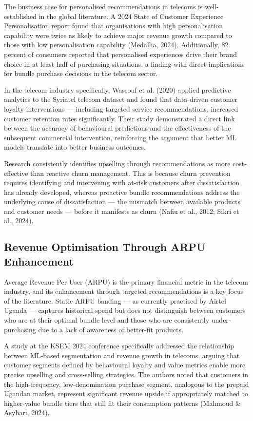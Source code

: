 The business case for personalised recommendations in telecoms is well-established in the global literature. A 2024 State of Customer Experience Personalisation report found that organisations with high personalisation capability were twice as likely to achieve major revenue growth compared to those with low personalisation capability (Medallia, 2024). Additionally, 82 percent of consumers reported that personalised experiences drive their brand choice in at least half of purchasing situations, a finding with direct implications for bundle purchase decisions in the telecom sector.

In the telecom industry specifically, Wassouf et al. (2020) applied predictive analytics to the Syriatel telecom dataset and found that data-driven customer loyalty interventions --- including targeted service recommendations, increased customer retention rates significantly. Their study demonstrated a direct link between the accuracy of behavioural predictions and the effectiveness of the subsequent commercial intervention, reinforcing the argument that better ML models translate into better business outcomes.

Research consistently identifies upselling through recommendations as more cost-effective than reactive churn management. This is because churn prevention requires identifying and intervening with at-risk customers after dissatisfaction has already developed, whereas proactive bundle recommendations address the underlying cause of dissatisfaction --- the mismatch between available products and customer needs --- before it manifests as churn (Nafiu et al., 2012; Sikri et al., 2024).


\subsection{Revenue Optimisation Through ARPU Enhancement}

Average Revenue Per User (ARPU) is the primary financial metric in the telecom industry, and its enhancement through targeted recommendations is a key focus of the literature. Static ARPU banding --- as currently practised by Airtel Uganda --- captures historical spend but does not distinguish between customers who are at their optimal bundle level and those who are consistently under-purchasing due to a lack of awareness of better-fit products.

A study at the KSEM 2024 conference specifically addressed the relationship between ML-based segmentation and revenue growth in telecoms, arguing that customer segments defined by behavioural loyalty and value metrics enable more precise upselling and cross-selling strategies. The authors noted that customers in the high-frequency, low-denomination purchase segment, analogous to the prepaid Ugandan market, represent significant revenue upside if appropriately matched to higher-value bundle tiers that still fit their consumption patterns (Mahmoud \& Asyhari, 2024).


